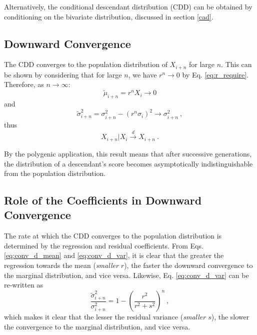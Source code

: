 \documentclass{svproc} %
\begin{document}
Alternatively, the conditional descendant distribution (CDD) can be obtained by conditioning on the bivariate distribution, discussed in section \ref{cad}.


\subsection{Downward Convergence}

The CDD converges to the population distribution of $X_{i+n}$ for large $n$. This can be shown by considering that for large $n$, we have $r^n \rightarrow 0$ by Eq. \ref{eq:r_require}. Therefore, as $n \rightarrow \infty$:
\begin{equation}
\tilde{\mu}_{i+n} = r^nX_i \rightarrow 0 
\label{eq:conv_d_mean}
\end{equation}
and
\begin{equation}
\tilde{\sigma}_{i+n}^2 = \sigma_{i+n}^2 - (r^n \sigma_i)^2 \rightarrow \sigma_{i+n}^2 \ ,
\label{eq:conv_d_var}
\end{equation}
thus
\begin{equation}
X_{i+n}|X_i \xrightarrow{\overset{}{d}} X_{i+n} \ .
\label{eq:conv_d}
\end{equation}

By the polygenic application, this result means that after successive generations, the distribution of a descendant's score becomes asymptotically indistinguishable from the population distribution. 

\subsection{Role of the Coefficients in Downward Convergence} \label{role_down}

The rate at which the CDD converges to the population distribution is determined by the regression and residual coefficients. From Eqs. \ref{eq:conv_d_mean} and \ref{eq:conv_d_var}, it is clear that the greater the regression towards the mean (\emph{smaller $r$}), the faster the downward convergence to the marginal distribution, and vice versa. Likewise, Eq. \ref{eq:conv_d_var} can be re-written as 
\begin{equation}
\frac{\tilde{\sigma}_{i+n}^2}{\sigma_{i+n}^2} = 1 - (\frac{r^2}{r^2+s^2})^n \ ,
\label{eq:conv_d_var_ratio}
\end{equation}
which makes it clear that the lesser the residual variance (\emph{smaller $s$}), the slower the convergence to the marginal distribution, and vice versa.
\end{document}
